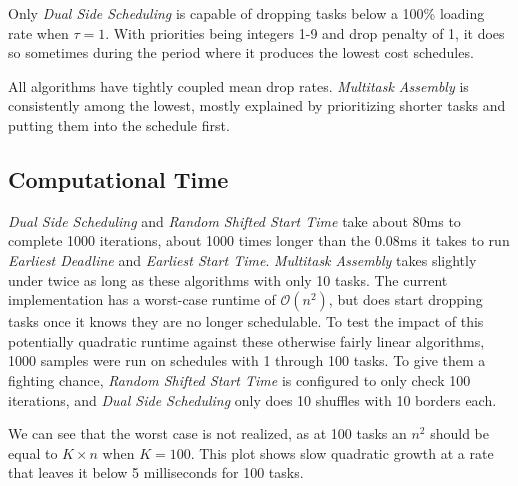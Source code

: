 \documentclass[conference]{IEEEtran}
\begin{document}
\begin{figure}[h]
	\centering
	{}
\end{figure}

Only \emph{Dual Side Scheduling} is capable of dropping tasks below a 100\% loading rate when $\tau = 1$. With priorities being integers 1-9 and drop penalty of 1, it does so sometimes during the period where it produces the lowest cost schedules.

All algorithms have tightly coupled mean drop rates. \emph{Multitask Assembly} is consistently among the lowest, mostly explained by prioritizing shorter tasks and putting them into the schedule first.

\subsection{Computational Time}

\begin{figure}[h]
	\centering
	{}
\end{figure}

\begin{figure}[h]
	\centering
	{}
\end{figure}

\emph{Dual Side Scheduling} and \emph{Random Shifted Start Time} take about 80ms to complete 1000 iterations, about 1000 times longer than the 0.08ms it takes to run \emph{Earliest Deadline} and \emph{Earliest Start Time}.
\emph{Multitask Assembly} takes slightly under twice as long as these algorithms with only 10 tasks. The current implementation has a worst-case runtime of $\mathcal{O}(n^2)$, but does start dropping tasks once it knows they are no longer schedulable.
To test the impact of this potentially quadratic runtime against these otherwise fairly linear algorithms, 1000 samples were run on schedules with 1 through 100 tasks.
To give them a fighting chance, \emph{Random Shifted Start Time} is configured to only check 100 iterations, and \emph{Dual Side Scheduling} only does 10 shuffles with 10 borders each.

\begin{figure}[h]
	\centering
	{}
\end{figure}

We can see that the worst case is not realized, as at 100 tasks an $n^2$ should be equal to $K \times n$ when $K = 100$.
This plot shows slow quadratic growth at a rate that leaves it below 5 milliseconds for 100 tasks.
\end{document}
